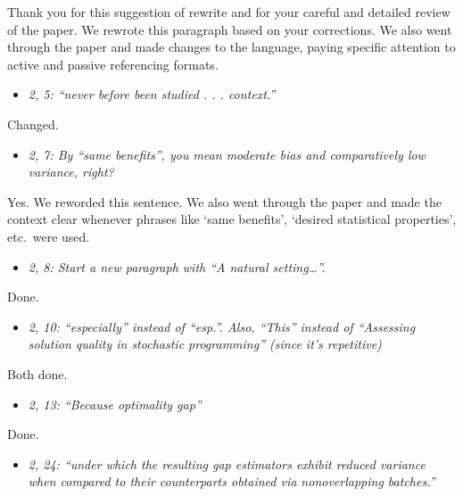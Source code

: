 \documentclass[11pt,notitlepage,onecolumn]{article}
\newcommand{\noi}{\noindent}
\begin{document}
\noi
Thank you for this suggestion of rewrite and for your careful and detailed review of the paper. 
We rewrote this paragraph based on your corrections.
We also went through the paper and made changes to the language, paying specific attention to active and passive referencing formats. 
\medskip 


\begin{itemize}
\item[] \textit{2, 5: ``never before been studied . . . context.''}
\end{itemize}

\noi
Changed.
\medskip 


\begin{itemize}
\item[] \textit{2, 7: By ``same benefits'', you mean moderate bias and comparatively low variance, right?}
\end{itemize}

\noi
Yes. We reworded this sentence. 
We also went through the paper and made the context clear whenever phrases like `same benefits', `desired statistical properties', etc.\ were used.  
\medskip 


\begin{itemize}
\item[] \textit{2, 8: Start a new paragraph with ``A natural setting\ldots ''.}
\end{itemize}

\noi
Done.
\medskip 


\begin{itemize}
\item[] \textit{2, 10: ``especially'' instead of ``esp.''. 
Also, ``This'' instead of ``Assessing solution quality in stochastic programming'' (since it's repetitive)}
\end{itemize}

\noi
Both done.  
\medskip 


\begin{itemize}
\item[] \textit{2, 13: ``Because optimality gap''}
\end{itemize}

\noi
Done.
\medskip 


\begin{itemize}
\item[] \textit{2, 24: ``under which the resulting gap estimators exhibit reduced variance when compared to their counterparts obtained via nonoverlapping batches.''}
\end{itemize}
\end{document}
